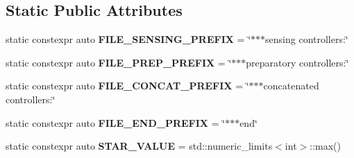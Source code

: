 \subsection*{Static Public Attributes}
\begin{DoxyCompactItemize}
\item 
static constexpr auto {\bfseries F\+I\+L\+E\+\_\+\+S\+E\+N\+S\+I\+N\+G\+\_\+\+P\+R\+E\+F\+IX} = \char`\"{}$\ast$$\ast$$\ast$sensing controllers\+:\char`\"{}\hypertarget{classkukadu_1_1ComplexController_a84d383d7c0934d9b3770c626256f0e18}{}\label{classkukadu_1_1ComplexController_a84d383d7c0934d9b3770c626256f0e18}

\item 
static constexpr auto {\bfseries F\+I\+L\+E\+\_\+\+P\+R\+E\+P\+\_\+\+P\+R\+E\+F\+IX} = \char`\"{}$\ast$$\ast$$\ast$preparatory controllers\+:\char`\"{}\hypertarget{classkukadu_1_1ComplexController_a7b18430010fc93226dc2a61add216b1b}{}\label{classkukadu_1_1ComplexController_a7b18430010fc93226dc2a61add216b1b}

\item 
static constexpr auto {\bfseries F\+I\+L\+E\+\_\+\+C\+O\+N\+C\+A\+T\+\_\+\+P\+R\+E\+F\+IX} = \char`\"{}$\ast$$\ast$$\ast$concatenated controllers\+:\char`\"{}\hypertarget{classkukadu_1_1ComplexController_a29ea3f3ccfccedb11db6c624a19cf16a}{}\label{classkukadu_1_1ComplexController_a29ea3f3ccfccedb11db6c624a19cf16a}

\item 
static constexpr auto {\bfseries F\+I\+L\+E\+\_\+\+E\+N\+D\+\_\+\+P\+R\+E\+F\+IX} = \char`\"{}$\ast$$\ast$$\ast$end\char`\"{}\hypertarget{classkukadu_1_1ComplexController_ae054423fe5c6195a509e110ab4989b5b}{}\label{classkukadu_1_1ComplexController_ae054423fe5c6195a509e110ab4989b5b}

\item 
static constexpr auto {\bfseries S\+T\+A\+R\+\_\+\+V\+A\+L\+UE} = std\+::numeric\+\_\+limits$<$int$>$\+::max()\hypertarget{classkukadu_1_1ComplexController_ac59524204cf956b8d9900387071641ca}{}\label{classkukadu_1_1ComplexController_ac59524204cf956b8d9900387071641ca}

\end{DoxyCompactItemize}
